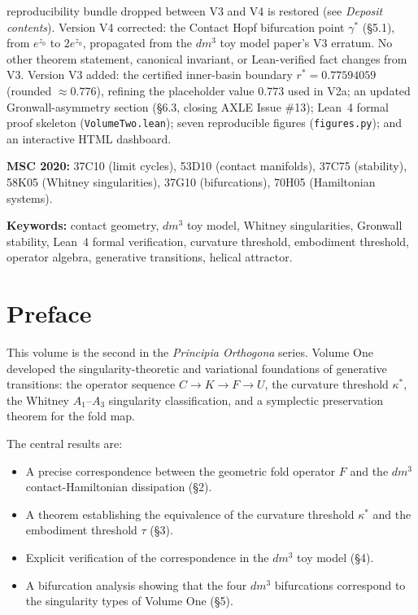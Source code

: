 \documentclass[11pt]{article}
\theoremstyle{boxed}
\begin{document}
reproducibility bundle dropped between V3 and V4 is restored (see \emph{Deposit contents}).
Version V4 corrected: the Contact Hopf bifurcation point $\gamma^{*}$ (\S 5.1),
from $e^{z_0}$ to $2e^{z_0}$, propagated from the $dm^3$ toy model paper's V3
erratum. No other theorem statement, canonical invariant, or Lean-verified
fact changes from V3. Version V3 added: the certified inner-basin boundary
$r^{*} = 0.77594059$ (rounded $\approx 0.776$), refining the placeholder value
$0.773$ used in V2a; an updated Gronwall-asymmetry section (\S 6.3, closing
AXLE Issue \#13); Lean~4 formal proof skeleton
(\texttt{VolumeTwo.lean}); seven reproducible figures (\texttt{figures.py});
and an interactive HTML dashboard.

\smallskip
\noindent\textbf{MSC 2020:} 37C10 (limit cycles), 53D10 (contact manifolds),
37C75 (stability), 58K05 (Whitney singularities), 37G10 (bifurcations), 70H05 (Hamiltonian systems).

\noindent\textbf{Keywords:} contact geometry, $dm^3$ toy model, Whitney
singularities, Gronwall stability, Lean~4 formal verification, curvature
threshold, embodiment threshold, operator algebra, generative transitions,
helical attractor.

\section*{Preface}

This volume is the second in the \emph{Principia Orthogona} series. Volume One
\cite{VolI} developed the singularity-theoretic and variational foundations of
generative transitions: the operator sequence $C \to K \to F \to U$, the
curvature threshold $\kappa^{*}$, the Whitney $A_1$--$A_3$ singularity
classification, and a symplectic preservation theorem for the fold map.

The central results are:
\begin{itemize}[leftmargin=2em]
  \item A precise correspondence between the geometric fold operator $F$ and the $dm^3$ contact-Hamiltonian dissipation (\S 2).
  \item A theorem establishing the equivalence of the curvature threshold $\kappa^{*}$ and the embodiment threshold $\tau$ (\S 3).
  \item Explicit verification of the correspondence in the $dm^3$ toy model (\S 4).
  \item A bifurcation analysis showing that the four $dm^3$ bifurcations correspond to the singularity types of Volume One (\S 5).
\end{itemize}
\end{document}
